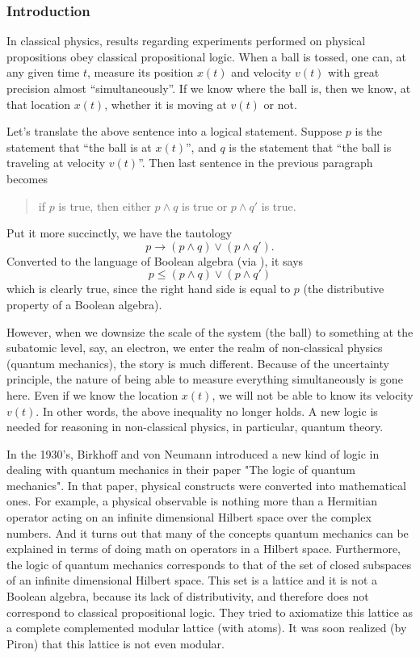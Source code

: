 \documentclass[12pt]{article}
\begin{document}
\subsubsection*{Introduction}
In classical physics, results regarding experiments performed on physical propositions obey classical propositional logic.  When a ball is tossed, one can, at any given time $t$, measure its position $x(t)$ and velocity $v(t)$ with great precision almost ``simultaneously''.  If we know where the ball is, then we know, at that location $x(t)$, whether it is moving at $v(t)$ or not.

Let's translate the above sentence into a logical statement.  Suppose $p$ is the statement that ``the ball is at $x(t)$'', and $q$ is the statement that ``the ball is traveling at velocity $v(t)$''.  Then last sentence in the previous paragraph becomes
\begin{quote}\begin{center}
if $p$ is true, then either $p\wedge q$ is true or $p\wedge q'$ is true.  
\end{center}\end{quote}
Put it more succinctly, we have the tautology $$p\to (p\wedge q)\vee (p\wedge q').$$  Converted to the language of Boolean algebra (via ), it says $$p\le (p\wedge q)\vee (p\wedge q')$$ which is clearly true, since the right hand side is equal to $p$ (the distributive property of a Boolean algebra).  

However, when we downsize the scale of the system (the ball) to something at the  subatomic level, say, an electron, we enter the realm of non-classical physics (quantum mechanics), the story is much different.  Because of the uncertainty principle, the nature of being able to measure everything simultaneously is gone here.  Even if we know the location $x(t)$, we will not be able to know its velocity $v(t)$.  In other words, the above inequality no longer holds.  A new logic is needed for reasoning in non-classical physics, in particular, quantum theory.

In the 1930's, Birkhoff and von Neumann introduced a new kind of logic in dealing with quantum mechanics in their paper "The logic of quantum mechanics".  In that paper, physical constructs were converted into mathematical ones.  For example, a physical observable is nothing more than a Hermitian operator acting on an infinite dimensional Hilbert space over the complex numbers.  And it turns out that many of the concepts quantum mechanics can be explained in terms of doing math on operators in a Hilbert space.  Furthermore, the logic of quantum mechanics corresponds to that of the set of closed subspaces of an infinite dimensional Hilbert space.  This set is a lattice and it is not a Boolean algebra, because its lack of distributivity, and therefore does not correspond to classical propositional logic.  They tried to axiomatize this lattice as a complete complemented modular lattice (with atoms).  It was soon realized (by Piron) that this lattice is not even modular.
\end{document}
